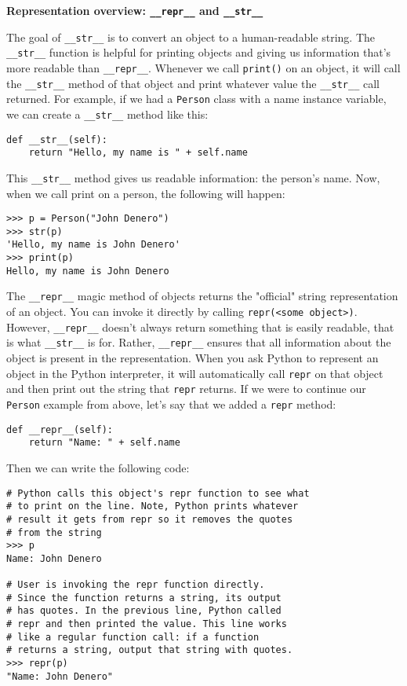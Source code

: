 \textbf{Representation overview: \lstinline{__repr__} and \lstinline{__str__}}

The goal of \lstinline{__str__} is to convert an object to a human-readable string. The \lstinline{__str__} function is helpful for printing objects and giving us information that's more readable than \lstinline{__repr__}. Whenever we call \lstinline{print()} on an object, it will call the \lstinline{__str__} method of that object and print whatever value the \lstinline{__str__} call returned. For example, if we had a \lstinline{Person} class with a name instance variable, we can create a \lstinline{__str__} method like this:
\begin{lstlisting}
def __str__(self):
    return "Hello, my name is " + self.name
\end{lstlisting}
This \lstinline{__str__} method gives us readable information: the person's name. Now, when we call print on a person, the following will happen:
\begin{lstlisting}
>>> p = Person("John Denero")
>>> str(p)
'Hello, my name is John Denero'
>>> print(p)              
Hello, my name is John Denero
\end{lstlisting}

The \lstinline{__repr__} magic method of objects returns the "official" string representation of an object. You can invoke it directly by calling \lstinline{repr(<some object>)}. However, \lstinline{__repr__} doesn't always return something that is easily readable, that is what \lstinline{__str__} is for. Rather, \lstinline{__repr__} ensures that all information about the object is present in the representation. When you ask Python to represent an object in the Python interpreter, it will automatically call \lstinline{repr} on that object and then print out the string that \lstinline{repr} returns. If we were to continue our \lstinline{Person} example from above, let's say that we added a \lstinline{repr} method:

\begin{lstlisting}
def __repr__(self):
    return "Name: " + self.name
\end{lstlisting}

Then we can write the following code:

\begin{lstlisting}
# Python calls this object's repr function to see what
# to print on the line. Note, Python prints whatever 
# result it gets from repr so it removes the quotes
# from the string
>>> p 
Name: John Denero

# User is invoking the repr function directly.
# Since the function returns a string, its output
# has quotes. In the previous line, Python called
# repr and then printed the value. This line works 
# like a regular function call: if a function 
# returns a string, output that string with quotes.
>>> repr(p) 
"Name: John Denero"
\end{lstlisting}


